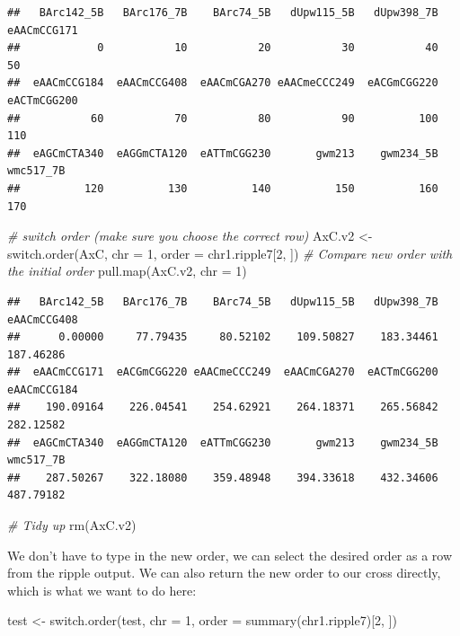 \documentclass[
]{book}
\newenvironment{Shaded}{\begin{snugshade}}{\end{snugshade}}
\newcommand{\AttributeTok}[1]{\textcolor[rgb]{0.77,0.63,0.00}{#1}}
\newcommand{\CommentTok}[1]{\textcolor[rgb]{0.56,0.35,0.01}{\textit{#1}}}
\newcommand{\DecValTok}[1]{\textcolor[rgb]{0.00,0.00,0.81}{#1}}
\newcommand{\FunctionTok}[1]{\textcolor[rgb]{0.00,0.00,0.00}{#1}}
\newcommand{\NormalTok}[1]{#1}
\newcommand{\OtherTok}[1]{\textcolor[rgb]{0.56,0.35,0.01}{#1}}
\begin{document}
\begin{verbatim}
##   BArc142_5B   BArc176_7B    BArc74_5B   dUpw115_5B   dUpw398_7B  eAACmCCG171 
##            0           10           20           30           40           50 
##  eAACmCCG184  eAACmCCG408  eAACmCGA270 eAACmeCCC249  eACGmCGG220  eACTmCGG200 
##           60           70           80           90          100          110 
##  eAGCmCTA340  eAGGmCTA120  eATTmCGG230       gwm213    gwm234_5B    wmc517_7B 
##          120          130          140          150          160          170
\end{verbatim}

\begin{Shaded}
\begin{Highlighting}[]
\CommentTok{\# switch order (make sure you choose the correct row)}
\NormalTok{AxC.v2 }\OtherTok{\textless{}{-}} \FunctionTok{switch.order}\NormalTok{(AxC, }\AttributeTok{chr =} \DecValTok{1}\NormalTok{, }\AttributeTok{order =}\NormalTok{ chr1.ripple7[}\DecValTok{2}\NormalTok{, }
\NormalTok{    ])}
\CommentTok{\# Compare new order with the initial order}
\FunctionTok{pull.map}\NormalTok{(AxC.v2, }\AttributeTok{chr =} \DecValTok{1}\NormalTok{)}
\end{Highlighting}
\end{Shaded}

\begin{verbatim}
##   BArc142_5B   BArc176_7B    BArc74_5B   dUpw115_5B   dUpw398_7B  eAACmCCG408 
##      0.00000     77.79435     80.52102    109.50827    183.34461    187.46286 
##  eAACmCCG171  eACGmCGG220 eAACmeCCC249  eAACmCGA270  eACTmCGG200  eAACmCCG184 
##    190.09164    226.04541    254.62921    264.18371    265.56842    282.12582 
##  eAGCmCTA340  eAGGmCTA120  eATTmCGG230       gwm213    gwm234_5B    wmc517_7B 
##    287.50267    322.18080    359.48948    394.33618    432.34606    487.79182
\end{verbatim}

\begin{Shaded}
\begin{Highlighting}[]
\CommentTok{\# Tidy up}
\FunctionTok{rm}\NormalTok{(AxC.v2)}
\end{Highlighting}
\end{Shaded}

We don't have to type in the new order, we can select the desired order as a row from the ripple output. We can also return the new order to our cross directly, which is what we want to do here:

\begin{Shaded}
\begin{Highlighting}[]
\NormalTok{test }\OtherTok{\textless{}{-}} \FunctionTok{switch.order}\NormalTok{(test, }\AttributeTok{chr =} \DecValTok{1}\NormalTok{, }\AttributeTok{order =} \FunctionTok{summary}\NormalTok{(chr1.ripple7)[}\DecValTok{2}\NormalTok{, }
\NormalTok{    ])}
\end{Highlighting}
\end{Shaded}
\end{document}
